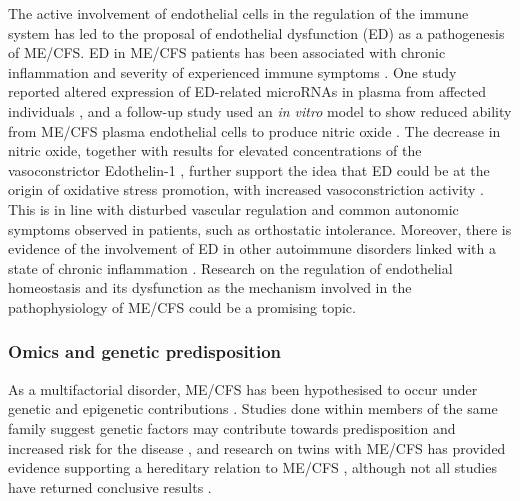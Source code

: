 The active involvement of endothelial cells in the regulation of the immune system has led to the proposal of endothelial dysfunction (ED) as a pathogenesis of ME/CFS.
ED in ME/CFS patients has been associated with chronic inflammation and severity of experienced immune symptoms \citep{scherbakov2020PeripheralEndothelial}.
One study reported altered expression of ED-related microRNAs in plasma from affected individuals \citep{blauensteiner2021AlteredEndothelial}, and a follow-up study used an \textit{in vitro} model to show reduced ability from ME/CFS plasma endothelial cells to produce nitric oxide \citep{bertinat2022DecreasedNO}.
The decrease in nitric oxide, together with results for elevated concentrations of the vasoconstrictor Edothelin-1 \citep{haffke2022EndothelialDysfunction}, further support the idea that ED could be at the origin of oxidative stress promotion, with increased vasoconstriction activity \citep{kostov2021CausalRelationship}.
This is in line with disturbed vascular regulation and common autonomic symptoms observed in patients, such as orthostatic intolerance.
Moreover, there is evidence of the involvement of ED in other autoimmune disorders linked with a state of chronic inflammation \citep{steyers2014EndothelialDysfunction}.
Research on the regulation of endothelial homeostasis and its dysfunction as the mechanism involved in the pathophysiology of ME/CFS could be a promising topic.


\subsubsection{Omics and genetic predisposition}

As a multifactorial disorder, ME/CFS has been hypothesised to occur under genetic and epigenetic contributions \citep{wang2017SystematicReview}.
Studies done within members of the same family suggest genetic factors may contribute towards predisposition and increased risk for the disease \citep{walsh2001FamilyHistory, albright2011EvidenceHeritable}, and research on twins with ME/CFS has provided evidence supporting a hereditary relation to ME/CFS \citep{buchwald2001TwinStudy}, although not all studies have returned conclusive results \citep{sullivan2005TwinAnalyses}.


